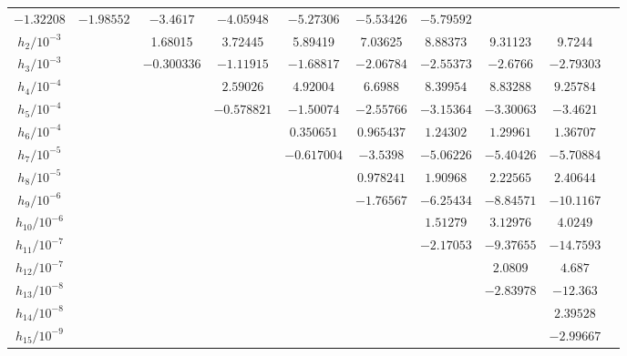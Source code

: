 \documentclass[
  aps,
  pre,
  preprint,
  longbibliography,
  floatfix
]{revtex4-2}
\begin{document}
\begin{table}
\begin{tabular}{c|ccccccccc}
      $-1.32208$ &
      $-1.98552$ &
      $-3.4617$ &
      $-4.05948$ &
      $-5.27306$ &
      $-5.53426$ &
      $-5.79592$ &
                \\
    $h_2/10^{-3}$ &
       &
      1.68015 &
      3.72445 &
      5.89419 &
      7.03625 &
      8.88373 &
      9.31123 &
      9.7244 &
                \\
    $h_3/10^{-3}$ & &
      $-0.300336$ &
      $-1.11915$ &
      $-1.68817$ &
      $-2.06784$ &
      $-2.55373$ &
      $-2.6766$ &
      $-2.79303$ &
                \\
    $h_4/10^{-4}$ & & &
      $2.59026$ &
      $4.92004$ &
      $6.6988$ &
      $8.39954$ &
      $8.83288$ &
      $9.25784$ &
                \\
    $h_5/10^{-4}$ & & &
      $-0.578821$ &
      $-1.50074$ &
      $-2.55766$ &
      $-3.15364$ &
      $-3.30063$ &
      $-3.4621$ &
                \\
    $h_6/10^{-4}$ & & & &
      $0.350651$ &
      $0.965437$ &
      $1.24302$ &
      $1.29961$ &
      $1.36707$ &
                \\
    $h_7/10^{-5}$ & & & &
      $-0.617004$ &
      $-3.5398$ &
      $-5.06226$ &
      $-5.40426$ &
      $-5.70884$ &
                \\
    $h_8/10^{-5}$ & & & & &
      $0.978241$ &
      $1.90968$ &
      $2.22565$ &
      $2.40644$ &
                \\
    $h_9/10^{-6}$ & & & & &
      $-1.76567$ &
      $-6.25434$ &
      $-8.84571$ &
      $-10.1167$ &
                \\
    $h_{10}/10^{-6}$ & & & & & &
      $1.51279$ &
      $3.12976$ &
      $4.0249$ &
                \\
    $h_{11}/10^{-7}$ & & & & & &
      $-2.17053$ &
      $-9.37655$ &
      $-14.7593$ &
                \\
    $h_{12}/10^{-7}$ & & & & & & &
      $2.0809$ &
      $4.687$ &
                \\
    $h_{13}/10^{-8}$ & & & & & & &
      $-2.83978$ &
      $-12.363$ &
                \\
    $h_{14}/10^{-8}$ & & & & & & & &
      $2.39528$ &
                \\
    $h_{15}/10^{-9}$ & & & & & & & &
      $-2.99667$ &
                \\
  \end{tabular}
\end{table}
\end{document}
